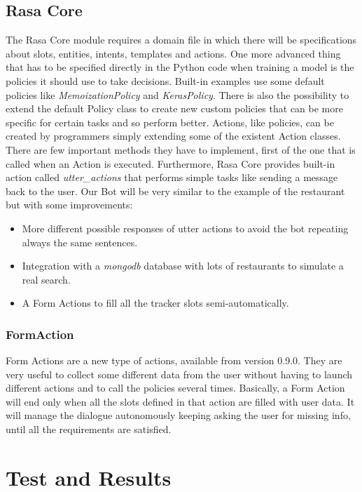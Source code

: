 \documentclass[11pt,a4paper]{article}
\begin{document}
\subsection{Rasa Core}

The Rasa Core module requires a domain file in which there will be specifications about slots, entities, intents, templates and actions. One more advanced thing that has to be specified directly in the Python code when training a model is the policies it should use to take decisions. Built-in examples use some default policies like \textit{MemoizationPolicy} and \textit{KerasPolicy}. There is also the possibility to extend the default Policy class to create new custom policies that can be more specific for certain tasks and so perform better.
Actions, like policies, can be created by programmers simply extending some of the existent Action classes. There are few important methods they have to implement, first of the one that is called when an Action is executed. Furthermore, Rasa Core provides built-in action called \textit{utter\_actions} that performs simple tasks like sending a message back to the user.
Our Bot will be very similar to the example of the restaurant but with some improvements:
\begin{itemize}
\item More different possible responses of utter actions to avoid the bot repeating always the same sentences.
\item Integration with a \textit{mongodb} database with lots of restaurants to simulate a real search.
\item A Form Actions to fill all the tracker slots semi-automatically.
\end{itemize}

\subsubsection{FormAction}
Form Actions are a new type of actions, available from version 0.9.0. They are very useful to collect some different data from the user without having to launch different actions and to call the policies several times. Basically, a Form Action will end only when all the slots defined in that action are filled with user data. It will manage the dialogue autonomously keeping asking the user for missing info, until all the requirements are satisfied.

\section{Test and Results}
\end{document}
